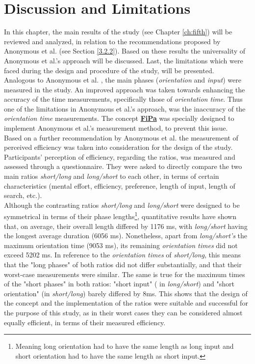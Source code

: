 
\chapter{Discussion and Limitations}\label{ch:sixth}

In this chapter, the main results of the study (see Chapter \ref{ch:fifth}) will be reviewed and analyzed, in relation to the recommendations proposed by Anonymous et al. \cite{anonymous} (see Section \ref{3.2.2}). Based on these results the universality of Anonymous et al.'s \cite{anonymous} approach will be discussed. Last, the limitations which were faced during the design and procedure of the study, will be presented.\\

Analogous to Anonymous et al. \cite{anonymous}, the main phases (\textit{orientation} and \textit{input}) were measured in the study. An improved approach was taken towards enhancing the accuracy of the time measurements, specifically those of \textit{orientation time}. Thus one of the limitations in Anonymous et al.'s \cite{anonymous} approach, was the inaccuracy of the \textit{orientation time} measurements. The concept \underline{\textbf{FiPa}} was specially designed to implement Anonymous et al.'s \cite{anonymous} measurement method, to prevent this issue. \\
Based on a further recommendation by Anonymous et al. \cite{anonymous} the measurement of perceived efficiency was taken into consideration for the design of the study. Participants' perception of efficiency, regarding the ratios, was measured and assessed through a questionnaire. They were asked to directly compare the two main ratios \textit{short/long} and \textit{long/short} to each other, in terms of certain characteristics (mental effort, efficiency, preference, length of input, length of search, etc.). \\

Although the contrasting ratios \textit{short/long} and \textit{long/short} were designed to be symmetrical in terms of their phase lengths\footnote{Meaning long orientation had to have the same length as long input and short orientation had to have the same length as short input.}, quantitative results have shown that, on average, their overall length differed by 1176 ms, with \textit{long/short} having the longest average duration (6056 ms). Nonetheless, apart from \textit{long/short's} the maximum orientation time (9053 ms), its remaining \textit{orientation times} did not exceed 5202 ms. In reference to the \textit{orientation times} of \textit{short/long}, this means that the "long phases" of both ratios did not differ substantially, and that their worst-case measurements were similar. The same is true for the maximum times of the "short phases" in both ratios: "short input" ( in \textit{long/short}) and "short orientation" (in \textit{short/long}) barely differed by 8ms. This shows that the design of the concept and the implementation of the ratios were suitable and successful for the purpose of this study, as in their worst cases they can be considered almost equally efficient, in terms of their measured efficiency. \\

